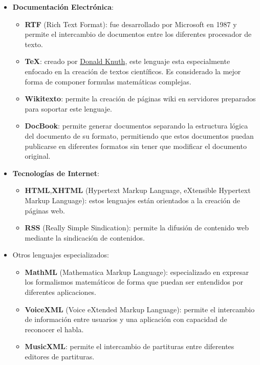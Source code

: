 \begin{itemize}
    \item \textbf{Documentación Electrónica}:
    \begin{itemize}
        \item \textbf{RTF} (Rich Text Format): fue desarrollado por Microsoft en 1987 y permite el intercambio de documentos entre los diferentes procesador de texto.
        \item \textbf{TeX}: creado por \href{https://es.wikipedia.org/wiki/Donald_Knuth}{Donald Knuth}, este lenguaje esta especialmente enfocado en la creación de textos científicos. Es considerado la mejor forma de componer formulas matemáticas complejas. \cite{tex}
        \item \textbf{Wikitexto}: permite la creación de páginas wiki en servidores preparados para soportar este lenguaje.
        \item \textbf{DocBook}: permite generar documentos separando la estructura lógica del documento de su formato, permitiendo que estos documentos puedan publicarse en diferentes formatos sin tener que modificar el documento original.
    \end{itemize}
    \item \textbf{Tecnologías de Internet}:
    \begin{itemize}
        \item \textbf{HTML},\textbf{XHTML} (Hypertext Markup Language, eXtensible Hypertext Markup Language): estos lenguajes están orientados a la creación de páginas web.
        \item \textbf{RSS} (Really Simple Sindication): permite la difusión de contenido web mediante la sindicación de contenidos.
    \end{itemize}
    \item Otros lenguajes especializados:
    \begin{itemize}
        \item \textbf{MathML} (Mathematica Markup Language): especializado en expresar los formalismos matemáticos de forma que puedan ser entendidos por diferentes aplicaciones.
        \item \textbf{VoiceXML} (Voice eXtended Markup Language): permite el intercambio de información entre usuarios y una aplicación con capacidad de reconocer el habla.
        \item \textbf{MusicXML}: permite el intercambio de partituras entre diferentes editores de partituras.
    \end{itemize}
\end{itemize}

